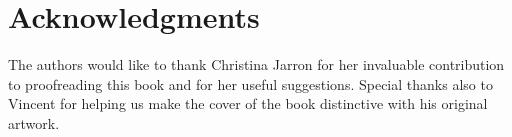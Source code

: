%
%
%
\chapter*{Acknowledgments}
The authors would like to thank Christina Jarron for her invaluable contribution to proofreading this book and for her useful suggestions. Special thanks also to Vincent for helping us make the cover of the book distinctive with his original artwork.
